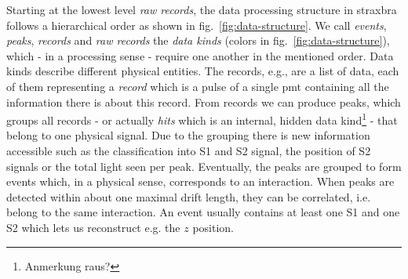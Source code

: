 Starting at the lowest level \emph{raw records}, the data processing structure in straxbra follows a hierarchical order as shown in fig.~\ref{fig:data-structure}.
We call \emph{events}, \emph{peaks}, \emph{records} and \emph{raw records} the \emph{data kinds} (colors in fig.~\ref{fig:data-structure}), which - in a processing sense - require one another in the mentioned order.
Data kinds describe different physical entities.
The records, e.g., are a list of data, each of them representing a \emph{record} which is a pulse of a single \gls{pmt} containing all the information there is about this record.
From records we can produce peaks, which groups all records - or actually \emph{hits} which is an internal, hidden data kind\footnote{Anmerkung raus?} - that belong to one physical signal.
Due to the grouping there is new information accessible such as the classification into S1 and S2 signal, the position of S2 signals or the total light seen per peak.
Eventually, the peaks are grouped to form events which, in a physical sense, corresponds to an interaction.
When peaks are detected within about one maximal drift length, they can be correlated, i.e. belong to the same interaction.
An event usually contains at least one S1 and one S2 which lets us reconstruct e.g. the $ z $ position.

